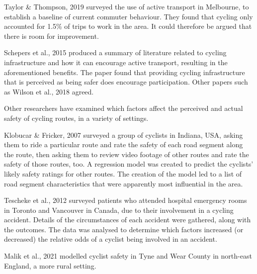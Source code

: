 \documentclass[11pt,twoside]{report}
\begin{document}
Taylor \& Thompson, 2019 \cite{melbactive} surveyed the use of active transport in Melbourne, to establish a baseline of current commuter behaviour.  They found that cycling only accounted for 1.5\% of trips to work in the area.  It could therefore be argued that there is room for improvement.

Schepers et al., 2015 \cite{SCHEPERS2015460} produced a summary of literature related to cycling infrastructure and how it can encourage active transport, resulting in the aforementioned benefits.  The paper found that providing cycling infrastructure that is perceived as being safer does encourage participation.  Other papers such as Wilson et al., 2018 \cite{WILSON2018234} agreed.

Other researchers have examined which factors affect the perceived and actual safety of cycling routes, in a variety of settings.

Klobucar \& Fricker, 2007 \cite{BIKESAFETY} surveyed a group of cyclists in Indiana, USA, asking them to ride a particular route and rate the safety of each road segment along the route, then asking them to review video footage of other routes and rate the safety of those routes, too.  A regression model was created to predict the cyclists' likely safety ratings for other routes.  The creation of the model led to a list of road segment characteristics that were apparently most influential in the area.

Tescheke et al., 2012 \cite{Teschke2012} surveyed patients who attended hospital emergency rooms in Toronto and Vancouver in Canada, due to their involvement in a cycling accident.  Details of the circumstances of each accident were gathered, along with the outcomes.  The data was analysed to determine which factors increased (or decreased) the relative odds of a cyclist being involved in an accident.

Malik et al., 2021 \cite{Malik2021} modelled cyclist safety in Tyne and Wear County in north-east England, a more rural setting.
\end{document}
